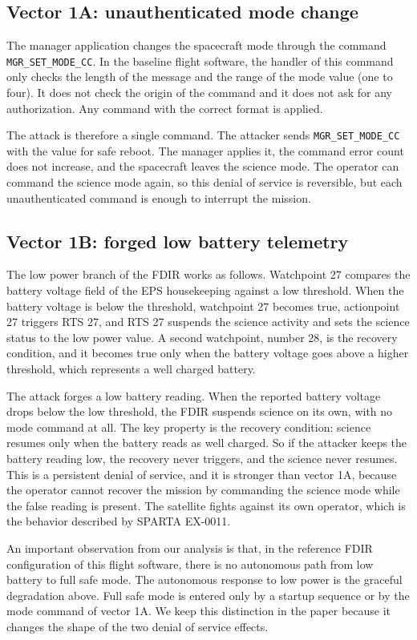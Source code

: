 \documentclass[conference,letterpaper,10pt]{IEEEtran}
\begin{document}
\subsection{Vector 1A: unauthenticated mode change}
The manager application changes the spacecraft mode through the command \texttt{MGR\_SET\_MODE\_CC}. In the baseline flight software, the handler of this command only checks the length of the message and the range of the mode value (one to four). It does not check the origin of the command and it does not ask for any authorization. Any command with the correct format is applied.

The attack is therefore a single command. The attacker sends \texttt{MGR\_SET\_MODE\_CC} with the value for safe reboot. The manager applies it, the command error count does not increase, and the spacecraft leaves the science mode. The operator can command the science mode again, so this denial of service is reversible, but each unauthenticated command is enough to interrupt the mission.

\subsection{Vector 1B: forged low battery telemetry}
The low power branch of the FDIR works as follows. Watchpoint 27 compares the battery voltage field of the EPS housekeeping against a low threshold. When the battery voltage is below the threshold, watchpoint 27 becomes true, actionpoint 27 triggers RTS 27, and RTS 27 suspends the science activity and sets the science status to the low power value. A second watchpoint, number 28, is the recovery condition, and it becomes true only when the battery voltage goes above a higher threshold, which represents a well charged battery.

The attack forges a low battery reading. When the reported battery voltage drops below the low threshold, the FDIR suspends science on its own, with no mode command at all. The key property is the recovery condition: science resumes only when the battery reads as well charged. So if the attacker keeps the battery reading low, the recovery never triggers, and the science never resumes. This is a persistent denial of service, and it is stronger than vector 1A, because the operator cannot recover the mission by commanding the science mode while the false reading is present. The satellite fights against its own operator, which is the behavior described by SPARTA EX-0011.

An important observation from our analysis is that, in the reference FDIR configuration of this flight software, there is no autonomous path from low battery to full safe mode. The autonomous response to low power is the graceful degradation above. Full safe mode is entered only by a startup sequence or by the mode command of vector 1A. We keep this distinction in the paper because it changes the shape of the two denial of service effects.
\end{document}
